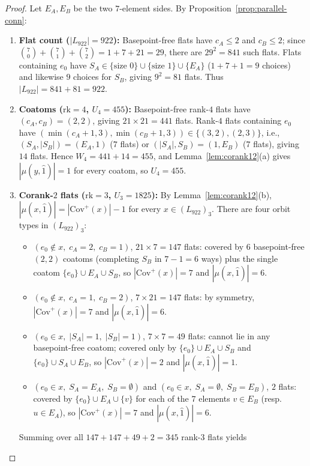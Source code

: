 \documentclass[11pt]{article}
\theoremstyle{definition}
\theoremstyle{remark}
\newcommand{\rk}{\mathrm{rk}}
\newcommand{\Cov}{\mathrm{Cov}}
\begin{document}
\begin{proof}
Let $E_A, E_B$ be the two $7$-element sides. By Proposition~\ref{prop:parallel-conn}:
\begin{enumerate}
\item[(1)] \textbf{Flat count ($|L_{922}| = 922$):} Basepoint-free flats have $c_A \le 2$ and $c_B \le 2$; since $\binom{7}{0}+\binom{7}{1}+\binom{7}{2} = 1+7+21 = 29$, there are $29^2 = 841$ such flats. Flats containing $e_0$ have $S_A \in \{\text{size } 0\} \cup \{\text{size } 1\} \cup \{E_A\}$ ($1 + 7 + 1 = 9$ choices) and likewise $9$ choices for $S_B$, giving $9^2 = 81$ flats. Thus $|L_{922}| = 841 + 81 = 922$.
\item[(2)] \textbf{Coatoms ($\rk = 4$, $U_4 = 455$):} Basepoint-free rank-$4$ flats have $(c_A, c_B) = (2, 2)$, giving $21 \times 21 = 441$ flats. Rank-$4$ flats containing $e_0$ have $(\min(c_A+1,3), \min(c_B+1,3)) \in \{(3,2), (2,3)\}$, i.e., $(S_A, |S_B|) = (E_A, 1)$ ($7$ flats) or $(|S_A|, S_B) = (1, E_B)$ ($7$ flats), giving $14$ flats. Hence $W_4 = 441 + 14 = 455$, and Lemma~\ref{lem:corank12}(a) gives $|\mu(y, \hat{1})| = 1$ for every coatom, so $U_4 = 455$.
\item[(3)] \textbf{Corank-$2$ flats ($\rk = 3$, $U_3 = 1825$):} By Lemma~\ref{lem:corank12}(b), $|\mu(x, \hat{1})| = |\Cov^+(x)| - 1$ for every $x \in (L_{922})_3$. There are four orbit types in $(L_{922})_3$:
\begin{itemize}
\item $(e_0 \notin x,\; c_A = 2,\; c_B = 1)$, $21 \times 7 = 147$ flats: covered by $6$ basepoint-free $(2,2)$ coatoms (completing $S_B$ in $7-1=6$ ways) plus the single coatom $\{e_0\} \cup E_A \cup S_B$, so $|\Cov^+(x)| = 7$ and $|\mu(x, \hat{1})| = 6$.
\item $(e_0 \notin x,\; c_A = 1,\; c_B = 2)$, $7 \times 21 = 147$ flats: by symmetry, $|\Cov^+(x)| = 7$ and $|\mu(x, \hat{1})| = 6$.
\item $(e_0 \in x,\; |S_A| = 1,\; |S_B| = 1)$, $7 \times 7 = 49$ flats: cannot lie in any basepoint-free coatom; covered only by $\{e_0\} \cup E_A \cup S_B$ and $\{e_0\} \cup S_A \cup E_B$, so $|\Cov^+(x)| = 2$ and $|\mu(x, \hat{1})| = 1$.
\item $(e_0 \in x,\; S_A = E_A,\; S_B = \emptyset)$ and $(e_0 \in x,\; S_A = \emptyset,\; S_B = E_B)$, $2$ flats: covered by $\{e_0\} \cup E_A \cup \{v\}$ for each of the $7$ elements $v \in E_B$ (resp.\ $u \in E_A$), so $|\Cov^+(x)| = 7$ and $|\mu(x, \hat{1})| = 6$.
\end{itemize}
Summing over all $147 + 147 + 49 + 2 = 345$ rank-$3$ flats yields

\end{enumerate}
\end{proof}
\end{document}

